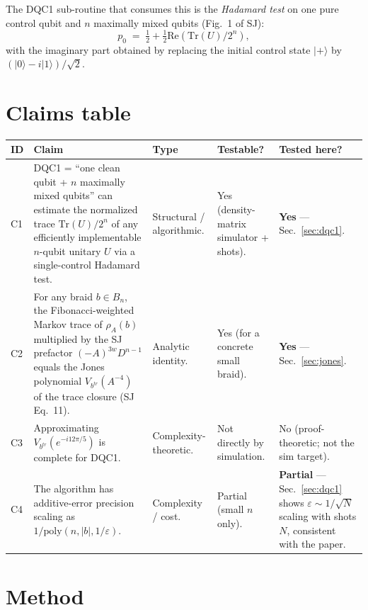 \documentclass[11pt]{article}
\begin{document}
\medskip
\noindent
The DQC1 sub-routine that consumes this is the \emph{Hadamard test} on one
pure control qubit and $n$ maximally mixed qubits (Fig.~1 of SJ):
\begin{equation}\label{eq:hadamard}
p_0 \;=\; \tfrac12 + \tfrac12 \mathrm{Re}\!\left(\mathrm{Tr}(U)/2^n\right),
\end{equation}
with the imaginary part obtained by replacing the initial control state
$|+\rangle$ by $(|0\rangle-i|1\rangle)/\sqrt 2$.

\section{Claims table}

\begin{longtable}{@{}p{0.7cm}p{7.7cm}p{2.4cm}p{2.4cm}p{2.6cm}@{}}
\toprule
ID & Claim & Type & Testable? & Tested here? \\
\midrule
C1 & DQC1 = ``one clean qubit + $n$ maximally mixed qubits'' can estimate
     the normalized trace $\mathrm{Tr}(U)/2^n$ of any efficiently
     implementable $n$-qubit unitary $U$ via a single-control Hadamard test.
     & Structural / algorithmic. & Yes (density-matrix simulator + shots). & \textbf{Yes} — Sec.~\ref{sec:dqc1}. \\
\midrule
C2 & For any braid $b\in B_n$, the Fibonacci-weighted Markov trace of
     $\rho_A(b)$ multiplied by the SJ prefactor $(-A)^{3w}D^{n-1}$ equals
     the Jones polynomial $V_{b^{tr}}(A^{-4})$ of the trace closure
     (SJ Eq.~11). & Analytic identity.
     & Yes (for a concrete small braid). & \textbf{Yes} — Sec.~\ref{sec:jones}. \\
\midrule
C3 & Approximating $V_{b^{tr}}(e^{-i12\pi/5})$ is complete for DQC1.
     & Complexity-theoretic. & Not directly by simulation. & No (proof-theoretic; not the sim target). \\
\midrule
C4 & The algorithm has additive-error precision scaling as $1/\mathrm{poly}(n,|b|,1/\varepsilon)$.
     & Complexity / cost. & Partial (small $n$ only). & \textbf{Partial} — Sec.~\ref{sec:dqc1} shows $\varepsilon \sim 1/\sqrt{N}$ scaling with shots $N$, consistent with the paper. \\
\bottomrule
\end{longtable}

\section{Method}\label{sec:method}
\end{document}

